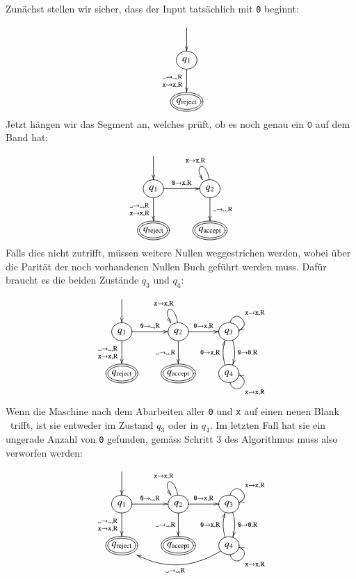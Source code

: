 Zunächst stellen wir sicher, dass der Input tatsächlich mit \texttt{0}
beginnt:
\[
\entrymodifiers={++[o][F]}
\xymatrix{
*+\txt{}\ar[d]
\\
{q_1}\ar[d]_{\genfrac{}{}{0pt}{1}{\blank\to\blank,\text{R}}{{\tt x}\to{\tt x},\text{R}}}
\\
*++[o][F=]{q_\text{reject}}
}
\]
Jetzt hängen wir das Segment an, welches prüft, ob es noch genau ein $\texttt{0}$
auf dem Band hat:
\[
\entrymodifiers={++[o][F]}
\xymatrix{
*+\txt{}\ar[d]
\\
{q_1}\ar[d]_{\genfrac{}{}{0pt}{1}{\blank\to\blank,\text{R}}{{\tt x}\to{\tt x},\text{R}}}
	\ar[r]^{\texttt{0}\to{\tt x},\text{R}}
	&{q_2}\ar[d]^{\blank\to\blank,\text{R}}
              \ar@(u,ul)_{{\tt x}\to {\tt x},\text{R}}
\\
*++[o][F=]{q_{\text{reject}}}
	&*++[o][F=]{q_\text{accept}}
}
\]
Falls dies nicht zutrifft, müssen weitere Nullen weggestrichen werden,
wobei über die Parität der noch vorhandenen Nullen Buch geführt werden
muss. Dafür braucht es die beiden Zustände $q_3$ und $q_4$:
\[
\entrymodifiers={++[o][F]}
\xymatrix{
*+\txt{}\ar[d]
\\
{q_1}\ar[d]_{\genfrac{}{}{0pt}{1}{\blank\to\blank,\text{R}}{{\tt x}\to{\tt x},\text{R}}}
	\ar[r]^{\texttt{0}\to\blank,\text{R}}
	&{q_2}\ar[d]_{\blank\to\blank,\text{R}}
	      \ar[r]^{\texttt{0}\to{\tt x},\text{R}}
              \ar@(u,ul)_{{\tt x}\to {\tt x},\text{R}}
		&{q_3}\ar@(u,r)^{{\tt x}\to{\tt x},\text{R}}
		      \ar@/^/[d]^{\texttt{0}\to \texttt{0},\text{R}}
\\
*++[o][F=]{q_\text{reject}}
	&*++[o][F=]{q_\text{accept}}
		&{q_4}\ar@/^/[u]^{\texttt{0}\to {\tt x},\text{R}}
		      \ar@(d,r)_{{\tt x}\to{\tt x},\text{R}}
}
\]
Wenn die Maschine nach dem Abarbeiten aller \texttt{0} und {\tt x} auf einen
neuen Blank \textvisiblespace\ trifft, ist sie entweder im Zustand
$q_3$ oder in $q_4$. Im letzten Fall hat sie ein ungerade Anzahl
von \texttt{0} gefunden, gemäss Schritt 3 des Algorithmus muss also verworfen
werden:
\[
\entrymodifiers={++[o][F]}
\xymatrix{
*+\txt{}\ar[d]
\\
{q_1}\ar[d]_{\genfrac{}{}{0pt}{1}{\blank\to\blank,\text{R}}{{\tt x}\to{\tt x},\text{R}}}
	\ar[r]^{\texttt{0}\to\blank,\text{R}}
	&{q_2}\ar[d]_{\blank\to\blank,\text{R}}
	      \ar[r]^{\texttt{0}\to{\tt x},\text{R}}
              \ar@(u,ul)_{{\tt x}\to {\tt x},\text{R}}
		&{q_3}\ar@(u,r)^{{\tt x}\to{\tt x},\text{R}}
		      \ar@/^/[d]^{\texttt{0}\to \texttt{0},\text{R}}
\\
*++[o][F=]{q_\text{reject}}
	&*++[o][F=]{q_\text{accept}}
		&{q_4}\ar@/^/[u]^{\texttt{0}\to {\tt x},\text{R}}
		      \ar@(d,r)_{{\tt x}\to{\tt x},\text{R}}
		      \ar@/^20pt/[ll]^{\blank\to\blank,\text{R}}
}
\]
